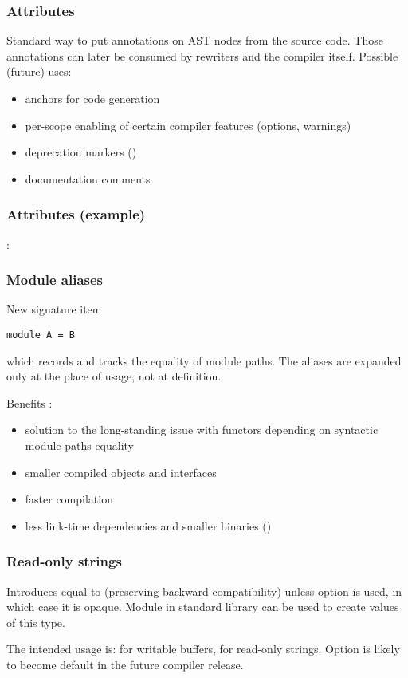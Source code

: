 \begin{frame}
\frametitle{Attributes}
Standard way to put annotations on AST nodes from the source code. Those annotations can later be consumed
by  rewriters and the compiler itself. Possible (future) uses:
\begin{itemize}
\item anchors for code generation
\item per-scope enabling of certain compiler features (options, warnings)
\item deprecation markers ()
\item documentation comments
\end{itemize}
\end{frame}

\begin{frame}
\frametitle{Attributes (example)}

 :

\end{frame}

\begin{frame}[fragile]
\frametitle{Module aliases}
New signature item
\begin{lstlisting}
module A = B
\end{lstlisting}
which records and tracks the equality of module paths. The aliases are expanded only at the place
of usage, not at definition.

Benefits :
\begin{itemize}
\item solution to the long-standing issue with functors depending on  syntactic module paths equality
\item smaller compiled objects and interfaces
\item faster compilation
\item less link-time dependencies and smaller binaries ()
\end{itemize}
\end{frame}

\begin{frame}
\frametitle{Read-only strings}
Introduces  equal to  (preserving backward compatibility) unless
option  is used, in which case it is opaque.
Module  in standard library can be used to create values of this type.
\par
The intended usage is:  for writable buffers,  for read-only strings.
Option  is likely to become default in the future compiler release.
\end{frame}

